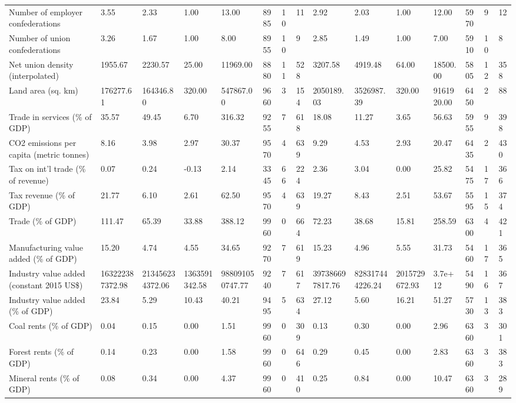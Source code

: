\begin{longtable}{lllllllllllllll}
\addlinespace
Number of employer confederations & 3.55 & 2.33 & 1.00 & 13.00 & 8985 & 10 & 11 & 2.92 & 2.03 & 1.00 & 12.00 & 5970 & 9 & 12\\
Number of union confederations & 3.26 & 1.67 & 1.00 & 8.00 & 8955 & 10 & 9 & 2.85 & 1.49 & 1.00 & 7.00 & 5910 & 10 & 8\\
Net union density (interpolated) & 1955.67 & 2230.57 & 25.00 & 11969.00 & 8880 & 11 & 528 & 3207.58 & 4919.48 & 64.00 & 18500.00 & 5805 & 12 & 358\\
Land area (sq. km) & 176277.61 & 164346.80 & 320.00 & 547867.00 & 9660 & 3 & 154 & 2050189.03 & 3526987.39 & 320.00 & 9161920.00 & 6450 & 2 & 88\\
Trade in services (\% of GDP) & 35.57 & 49.45 & 6.70 & 316.32 & 9255 & 7 & 618 & 18.08 & 11.27 & 3.65 & 56.63 & 5955 & 9 & 398\\
\addlinespace
CO2 emissions per capita (metric tonnes) & 8.16 & 3.98 & 2.97 & 30.37 & 9570 & 4 & 639 & 9.29 & 4.53 & 2.93 & 20.47 & 6435 & 2 & 430\\
Tax on int'l trade (\% of revenue) & 0.07 & 0.24 & -0.13 & 2.14 & 3345 & 66 & 224 & 2.36 & 3.04 & 0.00 & 25.82 & 5475 & 17 & 366\\
Tax revenue (\% of GDP) & 21.77 & 6.10 & 2.61 & 62.50 & 9570 & 4 & 639 & 19.27 & 8.43 & 2.51 & 53.67 & 5595 & 15 & 374\\
Trade (\% of GDP) & 111.47 & 65.39 & 33.88 & 388.12 & 9960 & 0 & 664 & 72.23 & 38.68 & 15.81 & 258.59 & 6300 & 4 & 421\\
Manufacturing value added (\% of GDP) & 15.20 & 4.74 & 4.55 & 34.65 & 9270 & 7 & 619 & 15.23 & 4.96 & 5.55 & 31.73 & 5460 & 17 & 365\\
\addlinespace
Industry value added (constant 2015 US\$) & 163222387372.98 & 213456234372.06 & 1363591342.58 & 988091050747.77 & 9240 & 7 & 617 & 397386697817.76 & 828317444226.24 & 2015729672.93 & 3.7e+12 & 5490 & 16 & 367\\
Industry value added (\% of GDP) & 23.84 & 5.29 & 10.43 & 40.21 & 9495 & 5 & 634 & 27.12 & 5.60 & 16.21 & 51.27 & 5730 & 13 & 383\\
Coal rents (\% of GDP) & 0.04 & 0.15 & 0.00 & 1.51 & 9960 & 0 & 309 & 0.13 & 0.30 & 0.00 & 2.96 & 6360 & 3 & 301\\
Forest rents (\% of GDP) & 0.14 & 0.23 & 0.00 & 1.58 & 9960 & 0 & 646 & 0.29 & 0.45 & 0.00 & 2.83 & 6360 & 3 & 383\\
Mineral rents (\% of GDP) & 0.08 & 0.34 & 0.00 & 4.37 & 9960 & 0 & 410 & 0.25 & 0.84 & 0.00 & 10.47 & 6360 & 3 & 289\\

\end{longtable}
